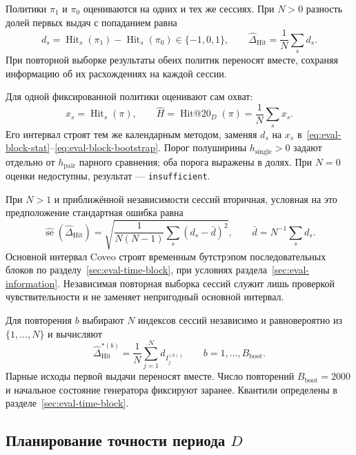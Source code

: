 \documentclass[12pt,a4paper]{article}
\newcommand{\code}[1]{{\ttfamily\small\nolinkurl{#1}}}
\theoremstyle{plainru}
\begin{document}
Политики $\pi_1$ и $\pi_0$ оцениваются на одних и тех же сессиях.
При $N>0$ разность долей первых выдач с попаданием равна
\begin{equation}\label{eq:eval-paired-diff}
 d_s=\operatorname{Hit}_s(\pi_1)-\operatorname{Hit}_s(\pi_0)\in\{-1,0,1\},\qquad
 \widehat\Delta_{\mathrm{Hit}}=
          \frac{1}{N}\sum_s d_s.
\end{equation}
При повторной выборке результаты обеих политик переносят вместе,
сохраняя информацию об их расхождениях на каждой сессии.

Для одной фиксированной политики оценивают сам охват:
\begin{equation}\label{eq:eval-single-policy}
x_s=\operatorname{Hit}_s(\pi),\qquad
\widehat H=\operatorname{Hit@20}_D(\pi)=\frac{1}{N}\sum_s x_s.
\end{equation}
Его интервал строят тем же календарным методом, заменяя $d_s$ на $x_s$
в~\eqref{eq:eval-block-stat}--\eqref{eq:eval-block-bootstrap}.
Порог полуширины $h_{\mathrm{single}}>0$ задают отдельно от
$h_{\mathrm{pair}}$ парного сравнения; оба порога выражены в долях.
При $N=0$ оценки недоступны, результат --- \code{insufficient}.

При $N>1$ и приближённой независимости сессий вторичная,
условная на это предположение стандартная ошибка равна
\begin{equation}\label{eq:eval-paired-se}
 \widehat{\operatorname{se}}(\widehat\Delta_{\mathrm{Hit}})
 =\sqrt{\frac{1}{N(N-1)}
       \sum_s(d_s-\bar d)^2},\qquad
 \bar d=N^{-1}\sum_s d_s.
\end{equation}
Основной интервал Coveo строят временным бутстрэпом последовательных
блоков по разделу~\ref{sec:eval-time-block}, при условиях
раздела~\ref{sec:eval-information}. Независимая повторная выборка сессий
\cite{bootstrap} служит лишь проверкой чувствительности и не заменяет
непригодный основной интервал.

Для повторения $b$ выбирают $N$ индексов сессий независимо и равновероятно
из $\{1,\ldots,N\}$ и вычисляют
\begin{equation}\label{eq:eval-bootstrap}
 \widehat\Delta_{\mathrm{Hit}}^{*(b)}
 =\frac{1}{N}\sum_{j=1}^{N}d_{I_j^{(b)}},
 \qquad b=1,\ldots,B_{\mathrm{boot}}.
\end{equation}
Парные исходы первой выдачи переносят вместе. Число повторений
$B_{\mathrm{boot}}=2000$ и начальное состояние генератора фиксируют
заранее. Квантили определены в разделе~\ref{sec:eval-time-block}.

\subsection{Планирование точности периода \texorpdfstring{$D$}{D}}
\label{sec:eval-precision}
\end{document}
